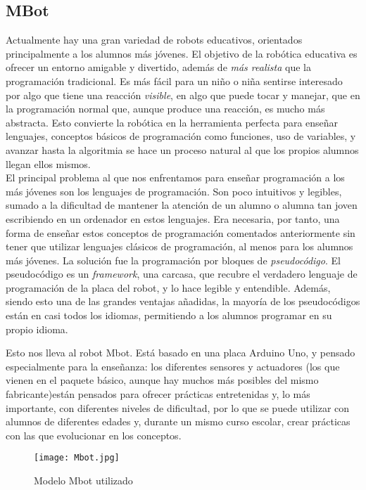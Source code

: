 \subsection{MBot}\label{subsec:mbot}
Actualmente hay una gran variedad de robots educativos, orientados principalmente a los alumnos más jóvenes. El objetivo de la robótica educativa es ofrecer un entorno amigable y divertido, además de \textit{más realista} que la programación tradicional. Es más fácil para un niño o niña sentirse interesado por algo que tiene una reacción \textit{visible}, en algo que puede tocar y manejar, que en la programación normal que, aunque produce una reacción, es mucho más abstracta. Esto convierte la robótica en la herramienta perfecta para enseñar lenguajes, conceptos básicos de programación como funciones, uso de variables, y avanzar hasta la algoritmia se hace un proceso natural al que los propios alumnos llegan ellos mismos. \\
El principal problema al que nos enfrentamos para enseñar programación a los más jóvenes son los lenguajes de programación. Son poco intuitivos y legibles, sumado a la dificultad de mantener la atención de un alumno o alumna tan joven escribiendo en un ordenador en estos lenguajes. Era necesaria, por tanto, una forma de enseñar estos conceptos de programación comentados anteriormente sin tener que utilizar lenguajes clásicos de programación, al menos para los alumnos más jóvenes. La solución fue la programación por bloques de \textit{pseudocódigo}. El pseudocódigo es un \textit{framework}, una carcasa, que recubre el verdadero lenguaje de programación de la placa del robot, y lo hace legible y entendible. Además, siendo esto una de las grandes ventajas añadidas, la mayoría de los pseudocódigos están en casi todos los idiomas, permitiendo a los alumnos programar en su propio idioma. \\
\par Esto nos lleva al robot Mbot. Está basado en una placa Arduino Uno, y pensado especialmente para la enseñanza: los diferentes sensores y actuadores (los que vienen en el paquete básico, aunque hay muchos más posibles del mismo fabricante)están pensados para ofrecer prácticas entretenidas y, lo más importante, con diferentes niveles de dificultad, por lo que se puede utilizar con alumnos de diferentes edades y, durante un mismo curso escolar, crear prácticas con las que evolucionar en los conceptos. 
\begin{figure}[H]
	\texttt{[image: Mbot.jpg]}\centering
	\label{img:mbot}\caption{Modelo Mbot utilizado}
\end{figure}
